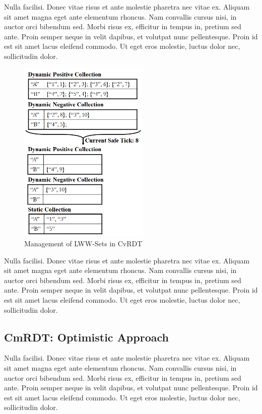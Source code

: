 \documentclass[sigconf,nonacm]{acmart}
\begin{document}
Nulla facilisi. Donec vitae risus et ante molestie pharetra nec vitae ex. Aliquam sit amet magna eget ante elementum rhoncus. Nam convallis cursus nisi, in auctor orci bibendum sed. Morbi risus ex, efficitur in tempus in, pretium sed ante. Proin semper neque in velit dapibus, et volutpat nunc pellentesque. Proin id est sit amet lacus eleifend commodo. Ut eget eros molestie, luctus dolor nec, sollicitudin dolor.

\begin{figure}[h]
  \centering
  \includegraphics[width=6.25cm]{Fig3CvRDT2}
  \caption{Management of LWW-Sets in CvRDT}
  \label{fig:cvrdt2}
\end{figure}

Nulla facilisi. Donec vitae risus et ante molestie pharetra nec vitae ex. Aliquam sit amet magna eget ante elementum rhoncus. Nam convallis cursus nisi, in auctor orci bibendum sed. Morbi risus ex, efficitur in tempus in, pretium sed ante. Proin semper neque in velit dapibus, et volutpat nunc pellentesque. Proin id est sit amet lacus eleifend commodo. Ut eget eros molestie, luctus dolor nec, sollicitudin dolor.

\subsection{CmRDT: Optimistic Approach}

Nulla facilisi. Donec vitae risus et ante molestie pharetra nec vitae ex. Aliquam sit amet magna eget ante elementum rhoncus. Nam convallis cursus nisi, in auctor orci bibendum sed. Morbi risus ex, efficitur in tempus in, pretium sed ante. Proin semper neque in velit dapibus, et volutpat nunc pellentesque. Proin id est sit amet lacus eleifend commodo. Ut eget eros molestie, luctus dolor nec, sollicitudin dolor.
\end{document}
